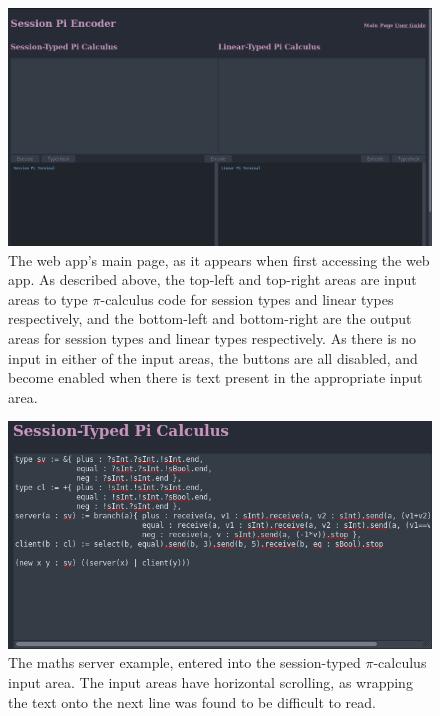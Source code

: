 \documentclass{l4proj}
\begin{document}
\begin{figure}[H]
\centering
\includegraphics[width=\textwidth]{images/InterfaceScreenshotMain.png}
\caption{The web app's main page, as it appears when first accessing the web app. As described above, the top-left and top-right areas are input areas to type $\pi$-calculus code for session types and linear types respectively, and the bottom-left and bottom-right are the output areas for session types and linear types respectively. As there is no input in either of the input areas, the buttons are all disabled, and become enabled when there is text present in the appropriate input area.}
\label{fig:scshMain}
\end{figure}
\begin{figure}[H]
\centering
\includegraphics[width=\textwidth]{images/InterfaceScreenshotProcess.png}
\caption{The maths server example, entered into the session-typed $\pi$-calculus input area. The input areas have horizontal scrolling, as wrapping the text onto the next line was found to be difficult to read.}
\label{fig:scshProc}
\end{figure}
\end{document}
